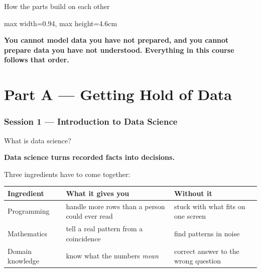 \documentclass[10pt,aspectratio=169]{beamer}
\newcommand{\keyidea}[1]{%
  \begin{block}{}
  \centering\Large\bfseries\color{dsblue} #1
  \end{block}%
}
\begin{document}
\begin{frame}{How the parts build on each other}
\begin{center}
\begin{adjustbox}{max width=0.94\linewidth, max height=4.6cm}
\end{adjustbox}
\end{center}
\vspace{0.5cm}
\keyidea{You cannot model data you have not prepared, and you cannot prepare data you have not understood. Everything in this course follows that order.}
\end{frame}

\part{Part A --- Getting Hold of Data}
\frame{\partpage}

\section{Session 1 --- Introduction to Data Science}

\begin{frame}{What is data science?}
\keyidea{Data science turns recorded facts into decisions.}
\vspace{0.3cm}
Three ingredients have to come together:
\begin{table}
\small
\begin{tabularx}{\linewidth}{@{}lXX@{}}
\toprule
\textbf{Ingredient} & \textbf{What it gives you} & \textbf{Without it} \\
\midrule
Programming & handle more rows than a person could ever read & stuck with what fits on one screen \\
Mathematics & tell a real pattern from a coincidence & find patterns in noise \\
Domain knowledge & know what the numbers \emph{mean} & correct answer to the wrong question \\
\bottomrule
\end{tabularx}
\end{table}
\end{frame}
\end{document}
